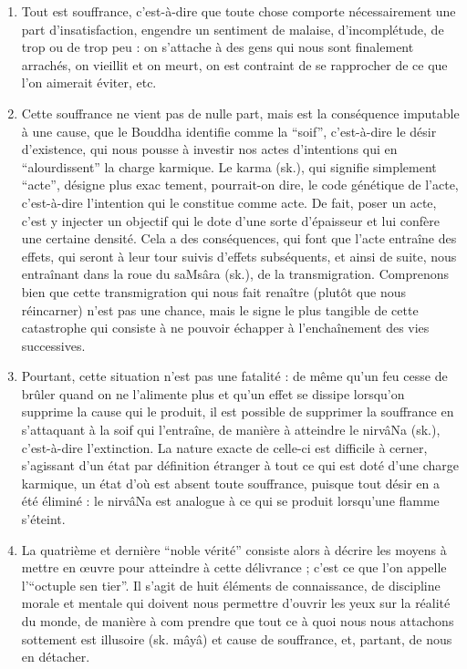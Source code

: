 \documentclass[11pt,a4paper]{article} %
\begin{document}
\begin{enumerate}
	\item Tout est souffrance, c'est-à-dire que toute chose comporte nécessairement
		une part d'insatisfaction, engendre un sentiment de malaise, d'incomplétude, de trop ou
		de trop peu : on s'attache à des gens qui nous sont finalement arrachés, on vieillit et on
		meurt, on est contraint de se rapprocher de ce que l'on aimerait éviter, etc.
	\item Cette souffrance ne vient pas de nulle part, mais est la conséquence imputable à une
		cause, que le Bouddha identifie comme la ``soif'', c'est-à-dire le désir
		d'existence, qui nous pousse à investir nos actes d'intentions qui en ``alourdissent'' la
		charge karmique.
		Le karma (sk.), qui signifie simplement ``acte'', désigne plus exac		tement, pourrait-on dire, le code génétique de l'acte, c'est-à-dire l'intention qui le
		constitue comme acte.
De fait, poser un acte, c'est y injecter un objectif qui le dote
		d'une sorte d'épaisseur et lui confère une certaine densité.
Cela a des conséquences, qui
		font que l'acte entraîne des effets, qui seront à leur tour suivis d'effets subséquents, et
		ainsi de suite, nous entraînant dans la roue du saMsâra (sk.), de la transmigration.
		Comprenons bien que cette transmigration qui nous fait renaître (plutôt que nous réincarner) n'est pas une chance, mais le signe le plus tangible de cette catastrophe qui
		consiste à ne pouvoir échapper à l'enchaînement des vies successives.
	\item Pourtant, cette situation n'est pas une fatalité : de même qu'un feu cesse de brûler
		quand on ne l'alimente plus et qu'un effet se dissipe lorsqu'on supprime la cause qui le
		produit, il est possible de supprimer la souffrance en s'attaquant à la soif qui l'entraîne,
		de manière à atteindre le nirvâNa (sk.), c'est-à-dire l'extinction.
La nature exacte de
		celle-ci est difficile à cerner, s'agissant d'un état par définition étranger à tout ce qui est
		doté d'une charge karmique, un état d'où est absent toute souffrance, puisque tout désir
		en a été éliminé : le nirvâNa est analogue à ce qui se produit lorsqu'une flamme s'éteint.
	\item La quatrième et dernière ``noble vérité'' consiste alors à décrire les moyens à mettre
		en œuvre pour atteindre à cette délivrance ; c'est ce que l'on appelle l'``octuple sen		tier''.
Il s'agit de huit éléments de connaissance, de discipline morale et mentale qui
		doivent nous permettre d'ouvrir les yeux sur la réalité du monde, de manière à com		prendre que tout ce à quoi nous nous attachons sottement est illusoire (sk. mâyâ) et
		cause de souffrance, et, partant, de nous en détacher.
\end{enumerate}
\end{document}
